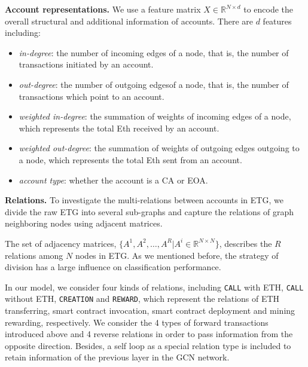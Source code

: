 \textbf{Account representations.} We use a feature matrix $X \in \mathbb{R}^{N \times d}$ to encode the overall structural and additional information of accounts. There are $d$ features including:
\begin{itemize}
	\item \emph{in-degree}: the number of incoming edges of a node, that is, the number of transactions initiated by an account.
	\item \emph{out-degree}: the number of outgoing edgesof a node, that is, the number of transactions which point to an account.
	\item \emph{weighted in-degree}: the summation of weights of incoming edges of a node, which represents the total Eth received by an account. 
	\item \emph{weighted out-degree}: the summation of weights of outgoing edges outgoing to a node, which represents the total Eth sent from an account. 
	\item \emph{account type}: whether the account is a CA or EOA.
\end{itemize}



\textbf{Relations.} To investigate the multi-relations between accounts in ETG, we divide the raw ETG into several sub-graphs and capture the relations of graph neighboring nodes using adjacent matrices. 

The set of adjacency matrices, $\{A^1,A^2,\dots,A^R|A^i\in \mathbb{R}^{N \times N}\}$, describes the $R$ relations among $N$ nodes in ETG. As we mentioned before, the strategy of division has a large influence on classification performance. 

In our model, we consider four kinds of relations, including \texttt{CALL} with ETH, \texttt{CALL} without ETH, \texttt{CREATION} and \texttt{REWARD}, which represent the relations of ETH transferring, smart contract invocation, smart contract deployment and mining rewarding, respectively. We consider the 4 types of forward transactions introduced above and 4 reverse relations in order to pass information from the opposite direction. Besides, a self loop as a special relation type is included to retain information of the previous layer in the GCN network. 

